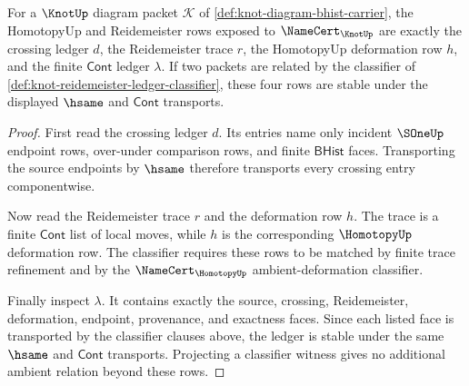 \begin{theorem}
\label{thm:knot-homotopy-ledger-boundary}
For a $\KnotUp$ diagram packet $\mathcal{K}$ of
\autoref{def:knot-diagram-bhist-carrier}, the HomotopyUp and Reidemeister
rows exposed to $\NameCert_{\KnotUp}$ are exactly the crossing ledger $d$, the
Reidemeister trace $r$, the HomotopyUp deformation row $h$, and the finite
$\mathsf{Cont}$ ledger $\lambda$. If two packets are related by the classifier
of \autoref{def:knot-reidemeister-ledger-classifier}, these four rows are
stable under the displayed $\hsame$ and $\mathsf{Cont}$ transports.
\end{theorem}
\begin{proof}
First read the crossing ledger $d$. Its entries name only incident
$\SOneUp$ endpoint rows, over-under comparison rows, and finite
$\mathsf{BHist}$ faces. Transporting the source endpoints by $\hsame$ therefore
transports every crossing entry componentwise.

Now read the Reidemeister trace $r$ and the deformation row $h$. The trace is
a finite $\mathsf{Cont}$ list of local moves, while $h$ is the corresponding
$\HomotopyUp$ deformation row. The classifier requires these rows to be
matched by finite trace refinement and by the $\NameCert_{\HomotopyUp}$
ambient-deformation classifier.

Finally inspect $\lambda$. It contains exactly the source, crossing,
Reidemeister, deformation, endpoint, provenance, and exactness faces. Since
each listed face is transported by the classifier clauses above, the ledger is
stable under the same $\hsame$ and $\mathsf{Cont}$ transports. Projecting a
classifier witness gives no additional ambient relation beyond these rows.
\end{proof}

